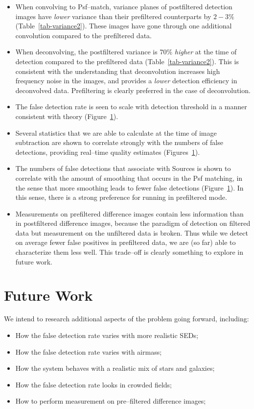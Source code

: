 \documentclass[prd, nofootinbib, floatfix, 11pt,tightenlines,times]{article}
\begin{document}
\begin{itemize}
\item When convolving to Psf--match, variance planes of postfiltered
  detection images have {\it lower} variance than their prefiltered
  counterparts by $2-3\%$ (Table~\ref{tab-variance2}).  These images
  have gone through one additional convolution compared to the
  prefiltered data.

\item When deconvolving, the postfiltered variance is 70\% {\it
  higher} at the time of detection compared to the prefiltered data
  (Table~\ref{tab-variance2}).  This is consistent with the
  understanding that deconvolution increases high frequency noise in
  the images, and provides a {\it lower} detection efficiency in
  deconvolved data.  Prefiltering is clearly preferred in the case of
  deconvolution.

\item The false detection rate is seen to scale with detection
  threshold in a manner consistent with theory (Figure~\ref{}).

\item Several statistics that we are able to calculate at the time of
  image subtraction are shown to correlate strongly with the numbers
  of false detections, providing real--time quality estimates
  (Figures~\ref{}).

\item The numbers of false detections that associate with Sources is
  shown to correlate with the amount of smoothing that occurs in the
  Psf matching, in the sense that more smoothing leads to fewer false
  detections (Figure~\ref{}).  In this sense, there is a strong
  preference for running in prefiltered mode.

\item Measurements on prefiltered difference images contain less
  information than in postfiltered difference images, because the
  paradigm of detection on filtered data but measurement on the
  unfiltered data is broken.  Thus while we detect on average fewer
  false positives in prefiltered data, we are (so far) able to
  characterize them less well.  This trade--off is clearly something
  to explore in future work.

\end{itemize}

\section{Future Work}

We intend to research additional aspects of the problem going forward,
including:
\begin{itemize}
\item How the false detection rate varies with more realistic SEDs;
\item How the false detection rate varies with airmass;
\item How the system behaves with a realistic mix of stars and galaxies;
\item How the false detection rate looks in crowded fields;
\item How to perform measurement on pre--filtered difference images;
\end{itemize}
\end{document}
